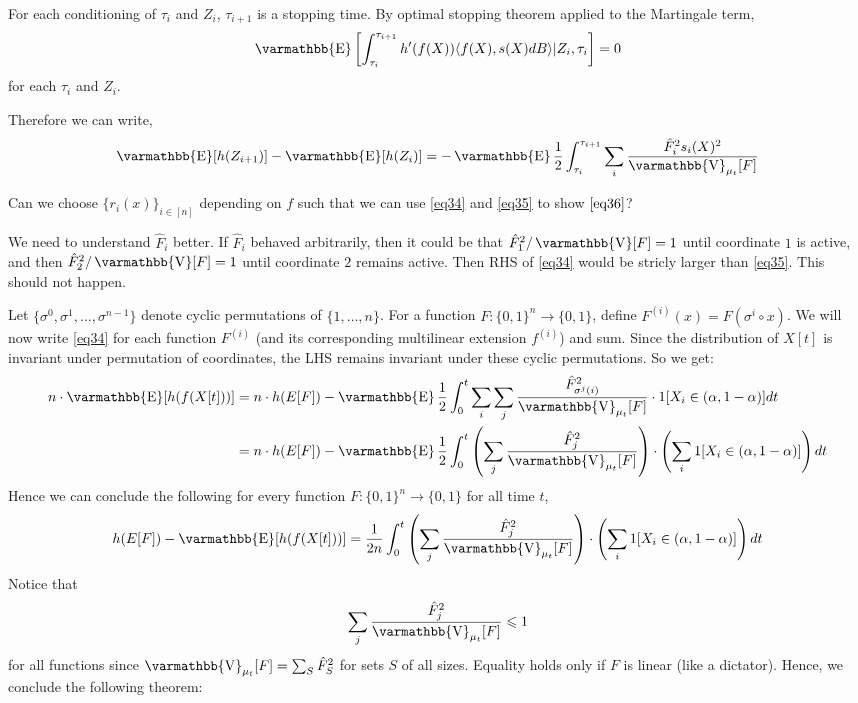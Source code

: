 \documentclass
[12pt,letterpaper]
{article}
\theoremstyle{definition}
\theoremstyle{remark}
\let\mathbb\varmathbb
\newcommand{\iprod}[1]{\langle#1\rangle}
\newcommand{\Esymb}{\mathbb{E}}
\newcommand{\Vsymb}{\mathbb{V}}
\DeclareMathOperator*{\E}{\Esymb}
\DeclareMathOperator*{\Var}{\Vsymb}
\newcommand{\bits}{\{0,1\}}
\renewcommand{\leq}{\leqslant}
\numberwithin{equation}{section}
\begin{document}
For each conditioning of $\tau_i$ and $Z_i$,  $\tau_{i+1}$ is a stopping time.  By optimal stopping theorem applied to the Martingale term,
\begin{align}
\E\left[ \int_{\tau_i}^{\tau_{i+1}} h'(f(X))\iprod{f(X), s(X)dB} | Z_i,\tau_i     \right] = 0
\end{align}
for each $\tau_i$ and $Z_i$.

Therefore we can write,
\begin{align}
	\E[h(Z_{i+1})]- \E[h(Z_i)] =  - \E \frac{1}{2} \int_{\tau_i}^{\tau_{i+1}} \sum_{i} \frac{\hat{F}_i^2s_i(X)^2}{\Var_{\mu_t}[F]}
\end{align}



Can we choose $\{ r_i(x)\}_{i\in [n]}$ depending on $f$ such that we can use  \eqref{eq34} and \eqref{eq35} to show $\eqref{eq36}$?   

We need to understand $\hat{F}_i$ better.  If $\hat{F}_i$ behaved arbitrarily, then it could be that $\hat{F}_1^2/\Var[F] = 1$ until coordinate $1$ is active, and then $\hat{F}_2^2 /\Var[F] = 1$ until coordinate $2$ remains active.  Then RHS of \eqref{eq34} would be stricly larger than \eqref{eq35}.  This should not happen.




\iffalse
Let $\{\sigma^0, \sigma^1,\ldots,\sigma^{n-1}\}$ denote cyclic permutations of $\{1,\ldots,n\}$.  For a function $F : \bits^n \to \bits$, define $F^{(i)}(x) = F(\sigma^i \circ x)$.   We will now write \eqref{eq34} for each function $F^{(i)}$ (and its corresponding multilinear extension $f^{(i)}$) and sum.  Since the distribution of $X[t]$ is invariant under permutation of coordinates, the LHS remains invariant under these cyclic permutations.  So we get:
\begin{align}
n \cdot \E[h(f(X[t]))] & = n \cdot h(E[F]) - \E \frac{1}{2} \int_0^t \sum_i \sum_j \frac{\hat{F}_{\sigma^{j}(i)}^2}{\Var_{\mu_t}[F]} \cdot 1[X_i \in (\alpha,1-\alpha)]  dt \\
& =  n \cdot h(E[F]) -  \E \frac{1}{2} \int_0^t  \left(\sum_j \frac{\hat{F}_{j}^2}{\Var_{\mu_t}[F]} \right) \cdot \left(\sum_i 1[X_i \in (\alpha,1-\alpha)] \right) dt
\end{align}
Hence we can conclude the following for every function $F:\bits^n \to \bits$ for all time $t$,
\begin{align}
h(E[F]) - \E[h(f(X[t]))] = \frac{1}{2n} \int_0^t  \left(\sum_j \frac{\hat{F}_{j}^2}{\Var_{\mu_t}[F]} \right) \cdot \left(\sum_i 1[X_i \in (\alpha,1-\alpha)] \right) dt
\end{align}
Notice that 
\[ \sum_j \frac{\hat{F}_{j}^2}{\Var_{\mu_t}[F]} \leq 1 \]
for all functions since $\Var_{\mu_t} [F] = \sum_{S} \hat{F}_S^2$ for sets $S$
 of all sizes.  Equality holds only if $F$ is linear (like a dictator).  Hence, we conclude the following theorem:
\end{document}
